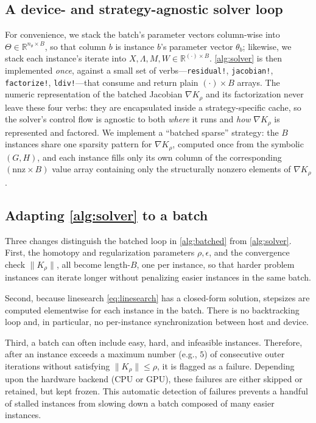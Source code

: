 \documentclass[conference]{IEEEtran}
\begin{document}
\subsection{A device- and strategy-agnostic solver loop}
\label{sec:batched:loop}

For convenience, we stack the batch's parameter vectors column-wise into $\Theta \in \mathbb{R}^{n_\theta
\times B}$, so that column $b$ is instance $b$'s parameter vector $\theta_b$;
likewise, we
stack each instance's iterate into $X, \Lambda, M, W \in \mathbb{R}^{(\cdot) \times B}$.
\cref{alg:solver} is then implemented \emph{once}, against a small set of verbs---\texttt{residual!}, \texttt{jacobian!}, \texttt{factorize!}, \texttt{ldiv!}---that
consume and return plain $(\cdot) \times B$ arrays. The numeric representation of the
batched Jacobian $\nabla K_\rho$ and its factorization never leave these four verbs: they
are encapsulated inside a strategy-specific cache, so the solver's control flow is agnostic to
both \emph{where} it runs
and \emph{how} $\nabla K_\rho$ is represented and factored. We implement a
``batched sparse'' strategy: the $B$ instances share one sparsity
pattern for $\nabla K_\rho$, computed once from the symbolic $(G, H)$, and each instance
fills only its own column of the corresponding $(\mathrm{nnz} \times B)$ value
array containing only the structurally nonzero elements of $\nabla K_\rho$.

\subsection{Adapting \cref{alg:solver} to a batch}

Three changes distinguish the batched loop in \cref{alg:batched} from \cref{alg:solver}. First, the homotopy
and regularization parameters $\rho, \epsilon$, and the convergence check
$\|K_\rho\|$, all become length-$B$, one per instance, so that harder
problem instances
can iterate longer without penalizing easier instances in the same batch.

Second, because linesearch \cref{eq:linesearch} has a
closed-form solution, stepsizes are computed elementwise for each instance in the batch. There is no backtracking loop and, in
particular, no per-instance synchronization between host and device.

Third, a batch can often include easy, hard, and infeasible instances.
Therefore, after an instance exceeds a maximum number (e.g., $5$) of consecutive
outer iterations  without satisfying $\|K_\rho\| \le \rho$, it is flagged as a
failure. Depending upon the hardware backend (CPU or GPU), these failures are
either skipped or retained, but kept frozen. This automatic
detection of failures prevents a handful of stalled instances from slowing down
a batch composed of many easier instances.
\end{document}
